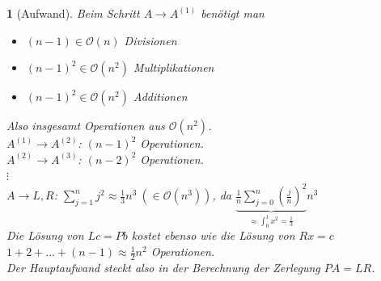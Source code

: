 \documentclass[12pt]{article}
\theoremstyle{break}
\newtheorem{nothing}[theorem]{}
\begin{document}
\begin{nothing}[Aufwand]
Beim Schritt $A \rightarrow A^{(1)}$ benötigt man 
\begin{itemize}
  \item $(n-1) \in \mathcal{O}(n)$ Divisionen 
  \item $(n-1)^2 \in \mathcal{O}(n^2)$ Multiplikationen
  \item $(n-1)^2 \in \mathcal{O}(n^2)$ Additionen
\end{itemize}
Also insgesamt Operationen aus $\mathcal{O}(n^2)$.\\
$A^{(1)} \rightarrow A^{(2)}$: $(n-1)^2$ Operationen. \\
$A^{(2)} \rightarrow A^{(3)}$: $(n-2)^2$ Operationen. \\
$\vdots$\\
$A \rightarrow L,R$: $\sum_{j=1}^n j^2 \approx \frac{1}{3}n^3 \medspace \left(\in \mathcal{O}(n^3)\right)$, da $\underbrace{\frac{1}{n} \sum_{j=0}^n \left(\frac{j}{n}\right)^2}_{ \approx \int_0^1 x^2 = \frac{1}{3}} n^3$\\
Die Lösung von $Lc = Pb$ kostet ebenso wie die Lösung von $Rx = c$ \\
$1+2+...+(n-1) \approx \frac{1}{2} n^2$ Operationen.\\
Der Hauptaufwand steckt also in der Berechnung der Zerlegung $PA = LR$. 
\end{nothing}
\end{document}
